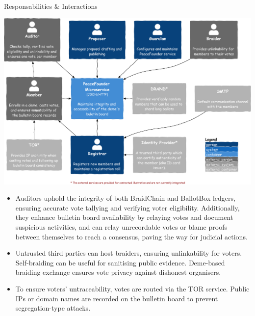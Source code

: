 \documentclass[final]{beamer}
\newlength{\colwidth}
\begin{document}
\begin{frame}[t]
\begin{columns}[t]
\begin{column}{\colwidth}
\begin{block}{Responsabilities \& Interactions}
    \begin{center}
      \includegraphics[width=0.65\colwidth]{figures/model-dependencies.pdf}
      \vspace{-1cm}
    \end{center}
    \begin{itemize}
    \item Auditors uphold the integrity of both BraidChain and BallotBox ledgers, ensuring accurate vote tallying and verifying voter eligibility. Additionally, they enhance bulletin board availability by relaying votes and document suspicious activities, and can relay unrecordable votes or blame proofs between themselves to reach a consensus, paving the way for judicial actions.
    \item Untrusted third parties can host braiders, ensuring unlinkability for voters. Self-braiding can be useful for sanitising public evidence. Deme-based braiding exchange ensures vote privacy against dishonest organisers. 
    \item To ensure voters' untraceability, votes are routed via the TOR service. Public IPs or domain names are recorded on the bulletin board to prevent segregation-type attacks. 
    \end{itemize}


\end{block}
\end{column}
\end{columns}
\end{frame}
\end{document}
